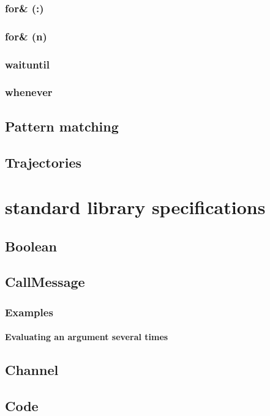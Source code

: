 \documentclass[openright,twoside,12pt]{report}
\begin{document}
\subsection{for\& (:)}
\subsection{for\& (n)}
\subsection{waituntil}
\subsection{whenever}

\FloatBarrier
\section{Pattern matching}
\FloatBarrier
\section{Trajectories}

\chapter{\us standard library specifications}
\label{sec:std}

\section{Boolean}
\section{CallMessage}
\label{sec:std-callmsg}
\subsection{Examples}
\subsubsection{Evaluating an argument several times}
\label{sec:std-callmsg-examples-several}
\section{Channel}
\section{Code}
\end{document}
